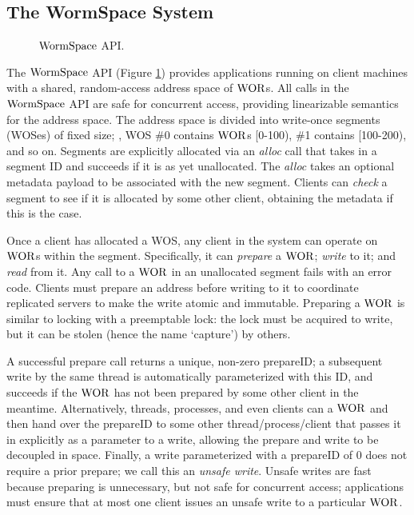 \subsection{The WormSpace System}
\label{chapter:wormspace:subsec:wormspace-system}

\begin{figure}

\caption{$\mathrm{WormSpace}$ API.}
\label{fig:chapter:multipaxos:api}
\end{figure}

The $\mathrm{WormSpace}$ API (Figure \ref{fig:chapter:multipaxos:api}) provides applications running on client machines with a shared, 
random-access address space of $\mathrm{WOR}$s. 
All calls in the $\mathrm{WormSpace}$ API are safe for concurrent access, providing linearizable semantics for the address space. 
The address space is divided into write-once segments (WOSes) of fixed size; 
\ie, WOS \#0 contains $\mathrm{WOR}$s [0-100), \#1 contains [100-200), and so on. 
Segments are explicitly allocated via an \textit{alloc} call that takes in a segment ID and succeeds if it is as yet unallocated. 
The \textit{alloc} takes an optional metadata payload to be associated with the new segment.
 Clients can \textit{check} a segment to see if it is allocated by some other client, obtaining the metadata if this is the case. 

Once a client has allocated a WOS, any client in the system can operate on $\mathrm{WOR}$s within the segment. 
Specifically, it can \textit{prepare} a $\mathrm{WOR}$; \textit{write} to it; and \textit{read} from it.
Any call to a $\mathrm{WOR}$ in an unallocated segment fails with an error code. 
Clients must prepare an address before writing to it to coordinate replicated servers to make the write atomic and immutable.
Preparing a $\mathrm{WOR}$ is similar to locking with a preemptable lock: the lock must be acquired to write, but it can be stolen (hence the name `capture') by others.

A successful prepare call returns a unique, non-zero prepareID; a subsequent write by the same thread is automatically parameterized with this ID, and succeeds if the $\mathrm{WOR}$ has not been prepared by some other client in the meantime. Alternatively, threads, processes, and even clients can  a $\mathrm{WOR}$ and then hand over the prepareID to some other thread/process/client that passes it in explicitly as a parameter to a write, allowing the prepare and write to be decoupled in space. Finally, a write parameterized with a prepareID of 0 does not require a prior prepare; we call this an \textit{unsafe write}. 
Unsafe writes are fast because preparing is unnecessary, but not safe for concurrent access; applications must ensure that at most one client issues an unsafe write to a particular $\mathrm{WOR}$.

